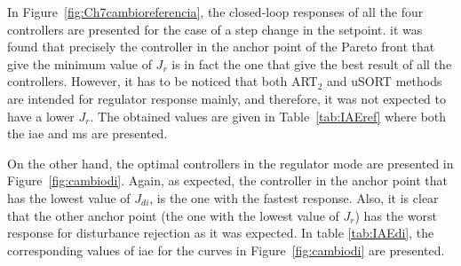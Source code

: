 In Figure~\ref{fig:Ch7cambioreferencia}, the closed-loop responses of all the four controllers are presented for the case of a step change in the setpoint. it was found that precisely the controller in the anchor point of the Pareto front that give the minimum value of $J_r$ is in fact the one that give the best result of all the controllers. However, it has to be noticed that both ART$_2$ and uSORT methods are intended for regulator response mainly, and therefore, it was not expected to have a lower $J_r$. The obtained values are given in Table~\ref{tab:IAEref} where both the \gls{iae} and \gls{ms} are presented. 

On the other hand, the optimal controllers in the regulator mode are presented in Figure~\ref{fig:cambiodi}. Again, as expected, the controller in the anchor point that has the lowest value of $J_{di}$, is the one with the fastest response. Also, it is clear that the other anchor point (the one with the lowest value of $J_r$) has the worst response for disturbance rejection as it was expected. In table \ref{tab:IAEdi}, the corresponding values of \gls{iae} for the curves in Figure~\ref{fig:cambiodi} are presented.

